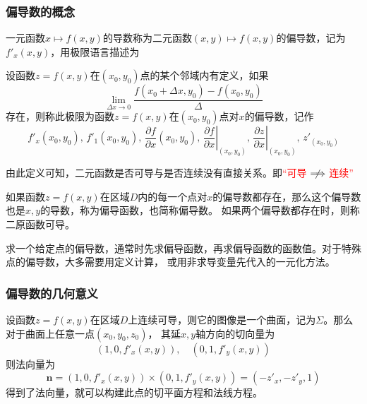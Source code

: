 \subsubsection{偏导数的概念}
一元函数$x\mapsto f(x,y)$的导数称为二元函数$(x,y)\mapsto f(x,y)$的偏导数，记为$f'_x(x,y)$，用极限语言描述为
\begin{definition}
    设函数$z=f(x,y)$在$(x_0,y_0)$点的某个邻域内有定义，如果
    \[ \lim_{\Delta x\to 0} \frac{f(x_0+\Delta x,y_0)-f(x_0,y_0)}{\Delta} \]
    存在，则称此极限为函数$z=f(x,y)$在$(x_0,y_0)$点对$x$的偏导数，记作
    \[
        f'_x(x_0,y_0),\,
        f'_1(x_0,y_0),\,
        \frac{\partial f}{\partial x}(x_0,y_0),\,
        \left.\frac{\partial f}{\partial x}\right|_{(x_0,y_0)},\,
        \left.\frac{\partial z}{\partial x}\right|_{(x_0,y_0)},\,
        z'_{(x_0,y_0)}
    \]
\end{definition}

由此定义可知，二元函数是否可导与是否连续没有直接关系。即\textcolor{red}{“可导$\centernot\implies$连续”}

如果函数$z=f(x,y)$在区域$D$内的每一个点对$x$的偏导数都存在，那么这个偏导数也是$x,y$的导数，称为偏导函数，也简称偏导数。
如果两个偏导数都存在时，则称二原函数可导。

\begin{situation}
    求一个给定点的偏导数，通常时先求偏导函数，再求偏导函数的函数值。对于特殊点的偏导数，大多需要用定义计算，
    或用非求导变量先代入的一元化方法。
\end{situation}

\subsubsection{偏导数的几何意义}
设函数$z=f(x,y)$在区域$D$上连续可导，则它的图像是一个曲面，记为$\Sigma$。那么对于曲面上任意一点$(x_0,y_0,z_0)$，
其延$x,y$轴方向的切向量为
\[ (1,0,f'_x(x,y)),\quad(0,1,f'_y(x,y)) \]
则法向量为
\begin{equation}
    \bm{n} = (1,0,f'_x(x,y)) \times (0,1,f'_y(x,y)) = (-z'_x, -z'_y, 1)
\end{equation}
得到了法向量，就可以构建此点的切平面方程和法线方程。

